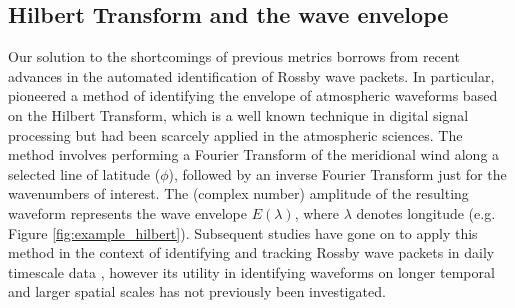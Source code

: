 \subsection{Hilbert Transform and the wave envelope}

Our solution to the shortcomings of previous metrics borrows from recent advances in the automated identification of Rossby wave packets. In particular, \citet{Zimin2003} pioneered a method of identifying the envelope of atmospheric waveforms based on the Hilbert Transform, which is a well known technique in digital signal processing but had been scarcely applied in the atmospheric sciences. The method involves performing a Fourier Transform of the meridional wind along a selected line of latitude ($\phi$), followed by an inverse Fourier Transform just for the wavenumbers of interest. The (complex number) amplitude of the resulting waveform represents the wave envelope $E(\lambda)$, where $\lambda$ denotes longitude (e.g. Figure \ref{fig:example_hilbert}). Subsequent studies have gone on to apply this method in the context of identifying and tracking Rossby wave packets in daily timescale data \citep{Glatt2014,Souders2014a}, however its utility in identifying waveforms on longer temporal and larger spatial scales has not previously been investigated.